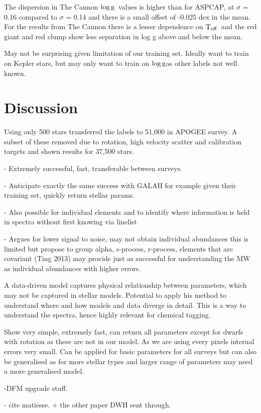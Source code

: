 \documentclass[12pt, preprint]{aastex}
\newcommand{\teff}{\mbox{$\rm T_{eff}$}}
\newcommand{\logg}{\mbox{$\rm \log g$}}
\begin{document}
The dispersion in The Cannon \logg\ values is higher than for ASPCAP, at $\sigma$ = 0.16 compared to $\sigma$ =  0.14 and there is a small offset of -0.025 dex in the mean. For the results from The Cannon there is a lesser dependence on \teff\ and the red giant and red clump show less separation in log g above and below the mean. 

May not be surprising given limitation of our training set. Ideally want to train on Kepler stars, but may only want to train on \logg as other labels not well known. 


\section{Discussion}

Using only 500 stars transferred the labels to 51,000 in APOGEE survey. A subset of these removed due to rotation, high velocity scatter and calibration targets and shown results for 37,500 stars. 

- Extremely successful, fast, transferable between surveys. 

- Anticipate exactly the same success with GALAH for example given their training set, quickly return stellar params. 

- Also possible for individual elements and to identify where information is held in spectra without first knowing via linelist

- Argues for lower signal to noise, may not obtain individual abundances this is limited but propose to group alpha, s-process, r-process, elements that are covariant (Ting 2013) may provide just as successful for understanding the MW as individual abundances with higher errors. 

A data-driven model captures physical relationship between parameters, which may not be captured in stellar models. Potential to apply his method to understand where and how models and data diverge in detail. This is a way to understand the spectra, hence highly relevant for chemical tagging. 

Show very simple, extremely fast, can return all parameters except for dwarfs with rotation as these are not in our model. As we are using every pixels internal errors very small. Can be applied for basic parameters for all surveys but can also be generalised as for more stellar types and larger range of parameters may need a more generalised model. 

-DFM upgrade stuff. 

- cite matiesse. + the other paper DWH sent through. 
\end{document}
